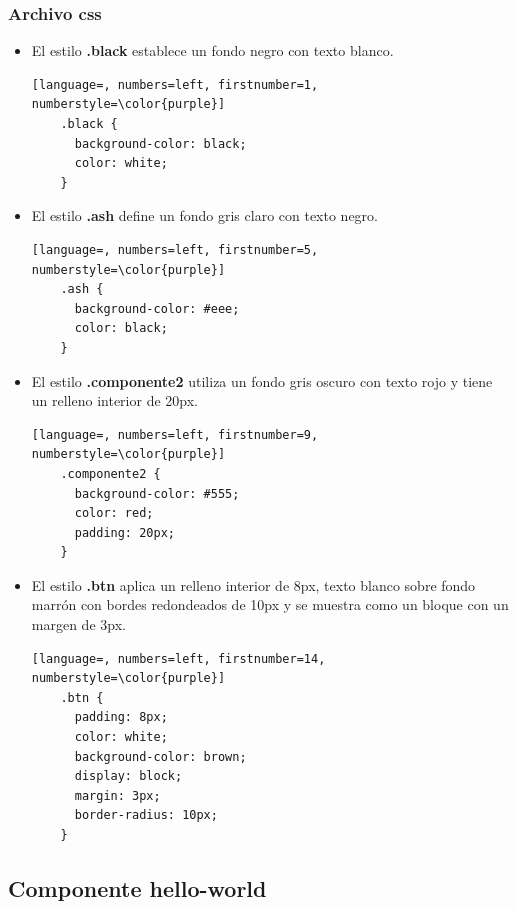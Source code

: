 \documentclass{article}
\begin{document}
  \subsubsection{Archivo css}
  \begin{itemize}
    \item El estilo \textbf{.black} establece un fondo negro con texto blanco.
    \begin{lstlisting}[language=, numbers=left, firstnumber=1, numberstyle=\color{purple}]
    .black {
      background-color: black;
      color: white;
    }
    \end{lstlisting}
    \item El estilo \textbf{.ash} define un fondo gris claro con texto negro.
    \begin{lstlisting}[language=, numbers=left, firstnumber=5, numberstyle=\color{purple}]
    .ash {
      background-color: #eee;
      color: black;
    }
    \end{lstlisting}
    \item El estilo \textbf{.componente2} utiliza un fondo gris oscuro con texto rojo y tiene un relleno interior de 20px.
    \begin{lstlisting}[language=, numbers=left, firstnumber=9, numberstyle=\color{purple}]
    .componente2 {
      background-color: #555;
      color: red;
      padding: 20px;
    }
    \end{lstlisting}
    \item El estilo \textbf{.btn} aplica un relleno interior de 8px, texto blanco sobre fondo marrón con bordes redondeados 
    de 10px y se muestra como un bloque con un margen de 3px.
    \begin{lstlisting}[language=, numbers=left, firstnumber=14, numberstyle=\color{purple}]
    .btn {
      padding: 8px;
      color: white;
      background-color: brown;
      display: block;
      margin: 3px;
      border-radius: 10px;
    }
    \end{lstlisting}
  \end{itemize}
  

  \subsection{Componente hello-world}
\end{document}
